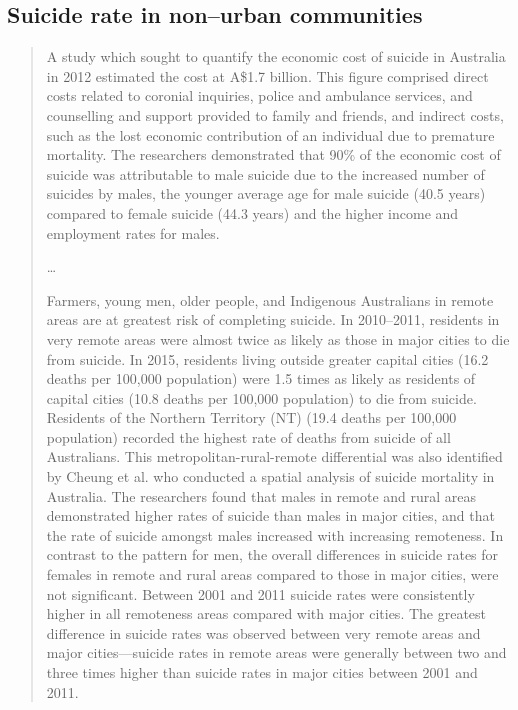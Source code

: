 \subsection{Suicide rate in non--urban communities}
\begin{quotation}
A study which sought to quantify the economic cost of suicide in Australia in 2012 estimated
the cost at A\$1.7 billion. This figure comprised direct costs related to coronial
inquiries, police and ambulance services, and counselling and support provided to family and
friends, and indirect costs, such as the lost economic contribution of an individual due to
premature mortality. The researchers demonstrated that 90\% of the economic
cost of suicide was attributable to male suicide due to the increased number of suicides by
males, the younger average age for male suicide (40.5 years) compared to female suicide
(44.3 years) and the higher income and employment rates for males.

\ldots

Farmers, young men, older people, and Indigenous Australians in remote areas are at greatest
risk of completing suicide. In 2010--2011, residents in very remote areas were almost twice as likely as those in major cities to die from
suicide. In 2015, residents living outside greater capital cities (16.2 deaths per 100,000 population) were 1.5 times as likely as residents of capital cities (10.8 deaths per 100,000 population) to die from suicide.
Residents of the Northern Territory (NT) (19.4 deaths per 100,000 population) recorded the
highest rate of deaths from suicide of all Australians.
This metropolitan-rural-remote differential was also identified by Cheung et al. who
conducted a spatial analysis of suicide mortality in Australia. The researchers found that males in
remote and rural areas demonstrated higher rates of suicide than males in major cities, and that
the rate of suicide amongst males increased with increasing remoteness.
In contrast to the pattern for men, the overall differences in suicide rates for females in remote
and rural areas compared to those in major cities, were not significant.
Between 2001 and 2011 suicide rates were consistently higher in all remoteness areas
compared with major cities. The greatest difference in suicide rates was observed
between very remote areas and major cities---suicide rates in remote areas were generally
between two and three times higher than suicide rates in major cities between 2001 and 2011\cite[p25-26]{RefWorks:326}.
\end{quotation}

